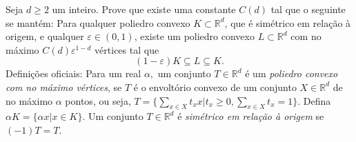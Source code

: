 Seja \(d \ge 2\) um inteiro. Prove que existe uma constante \(C(d)\) tal que o seguinte se mantém: Para qualquer poliedro convexo \(K \subset \mathbb{R}^d\), que é simétrico em relação à origem, e qualquer \(\varepsilon \in (0, 1)\), existe um poliedro convexo \(L \subset \mathbb{R}^d\) com no máximo \(C(d) \varepsilon^{1-d}\) vértices tal que
\[(1-\varepsilon)K \subseteq L \subseteq K.\]
Definições oficiais: Para um real \(\alpha,\) um conjunto \(T \in \mathbb{R}^d\) é um \textit{poliedro convexo com no máximo  vértices}, se \(T\) é o envoltório convexo de um conjunto \(X \in \mathbb{R}^d\) de no máximo \(\alpha\) pontos, ou seja, \(T = \{\sum\limits_{x\in X} t_x x | t_x \ge 0, \sum\limits_{x \in X} t_x = 1\}.\) Defina \(\alpha K = \{\alpha x | x \in K\}.\) Um conjunto \(T \in \mathbb{R}^d\) é \textit{simétrico em relação à origem} se \((-1)T = T.\)
